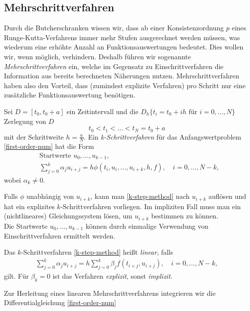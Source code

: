 \subsection{Mehrschrittverfahren}
Durch die Butcherschranken wissen wir, dass ab einer Konsistenzordnung $p$ eines Runge-Kutta-Verfahrens immer mehr
Stufen ausgerechnet werden müssen, was wiederum eine erhöhte Anzahl an Funktionsauswertungen bedeutet. Dies wollen wir,
wenn möglich, verhindern. Deshalb führen wir sogenannte \textit{Mehrschrittverfahren} ein, welche im Gegensatz zu
Einschrittverfahren die Information aus bereits berechneten Näherungen nutzen. Mehrschrittverfahren haben also den
Vorteil, dass (zumindest explizite Verfahren) pro Schritt nur eine zusätzliche Funktionsauswertung benötigen.
\begin{definition}
    Sei $D = \left[ t_0, t_0 +a \right]$ ein Zeitintervall und die $D_h \{ t_i = t_0 + ih \text{ für } i = 0, \dots, N\}$
    Zerlegung von $D$
    \[
        t_0 < t_1 < \dots < t_N = t_0 + a
    \]
    mit der Schrittweite $h = \frac{a}{N}$. Ein {\em k-Schrittverfahren} für das Anfangswertproblem
    \eqref{first-order-num} hat die Form
    \begin{align}
        \label{k-step-method}
        &\text{Startwerte } u_0, \dots, u_{k-1}, \nonumber \\
        & \sum_{j=0}^{k} \alpha_j u_{i+j} = h \phi(t_i, u_i, \dots, u_{i+k},h,f), \quad i=0,\dots,N-k,
    \end{align}
    wobei $\alpha_k \neq 0$.
\end{definition}
Falls $\phi$ unabhängig von $u_{i+k}$, kann man \eqref{k-step-method} nach $u_{i+k}$
auflösen und hat ein explizites $k$-Schrittverfahren vorliegen. Im impliziten Fall muss man ein (nichtlineares)
Gleichungssystem lösen, um $u_{i+k}$ bestimmen zu können.\\
Die Startwerte $u_0, \dots, u_{k-1}$ können durch einmalige Verwendung von Einschrittverfahren ermittelt werden.
\begin{definition}
    Das $k$-Schrittverfahren \eqref{k-step-method} heißt {\em linear}, falls
    \begin{align}
        \label{k-step-linear}
        \sum_{j=0}^{k} \alpha_j u_{i+j} = h \sum_{j=0}^{k} \beta_j f(t_{i+j}, u_{i+j}), \quad i = 0, \dots, N-k,
    \end{align}
    gilt. Für $\beta_k = 0$ ist das Verfahren {\em explizit}, sonst {\em implizit}.
\end{definition}
Zur Herleitung eines linearen Mehrschrittverfahrens integrieren wir die Differentialgleichung \eqref{first-order-num}
